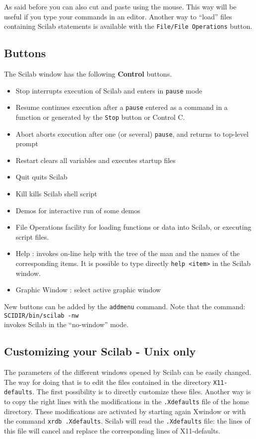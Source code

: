 As said before you can also cut and paste using the mouse. This way will be
useful if you type your commands in an editor. Another way to 
``load'' files containing Scilab statements
is available with the {\tt File/File Operations} button.

\subsection{Buttons}
The Scilab window has the following {\bf Control} buttons.\\

%
\begin{itemize}
\item Stop     interrupts execution of Scilab and enters in 
{\tt pause} mode
\item Resume    continues execution after a {\tt pause}
entered as a command in a function or generated by the {\tt Stop}
button or Control C.
\item Abort     aborts execution after one (or several) {\tt pause}, 
and returns to top-level prompt
\item Restart   clears all variables and executes startup files
\item Quit      quits Scilab
\item Kill      kills Scilab shell script
\item Demos     for interactive run of some demos
\item File Operations   facility for loading functions or data into
Scilab, or executing script files. 
\item Help : invokes on-line help with the tree of the man and the 
names of the corresponding items. It is possible to type directly 
{\tt help <item>} in the Scilab window.
\item Graphic Window : select active graphic window
\end{itemize}
%
New buttons can be added by the 
{\tt addmenu} command.
Note that the command:\\
{\tt SCIDIR/bin/scilab -nw} \\
invokes Scilab in the ``no-window'' mode.

\subsection{Customizing your Scilab - Unix only}


The parameters of the different windows opened by 
Scilab can be easily changed. The way for doing that is to edit the files 
contained in the directory {\tt X11-defaults}. The first possibility is 
to directly customize these files. Another way is to copy 
the right lines with the modifications in the {\tt .Xdefaults} 
file of the home directory.
These modifications are activated by starting again Xwindow or with the
command {\tt xrdb .Xdefaults}. Scilab will read the {\tt .Xdefaults} file: 
the lines of this
file will cancel and replace the corresponding lines of X11-defaults.

